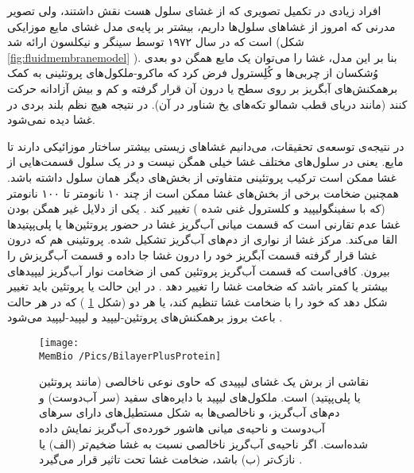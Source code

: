 افراد زیادی در تکمیل تصویری که از غشای سلول هست نقش داشتند، ولی تصویر مدرنی که امروز از غشاهای سلول‌ها داریم، بیشتر بر پایه‌ی مدل غشای مایع موزایکی‌
 است که در سال ۱۹۷۲ توسط سینگر
  و نیکلسون
 ارائه شد
\cite{Singer1972}
(شکل 
\ref{fig:fluidmembranemodel}
). بنا بر این مدل، غشا را می‌توان یک مایع همگن دو بعدی وُشکسان از چربی‌ها و کُلِسترول فرض کرد که ماکرو-ملکول‌های پروتئینی به کمک برهمکنش‌های آبگریز  بر روی سطح یا درون آن قرار گرفته و کم و بیش آزادانه حرکت کنند (مانند دریای قطب شمالو تکه‌های یخ  شناور در آن).  در نتیجه هیچ نظم بلند بردی در غشا دیده نمی‌شود. 

در نتیجه‌ی توسعه‌ی تحقیقات، می‌دانیم غشا‌های زیستی بیشتر ساختار موزائیکی دارند تا مایع. یعنی در سلول‌های مختلف غشا خیلی همگن نیست و در یک سلول قسمت‌هایی از غشا ممکن است  ترکیب پروتئینی متفاوتی از بخش‌های دیگر همان سلول داشته باشد. همچنین ضخامت برخی از بخش‌های غشا ممکن است از چند ۱۰ نانومتر تا ۱۰۰ نانومتر (که با سفینگولیپید
و کلسترول غنی شده
) تغییر کند
\cite{Engelman:2005aa}
. یکی از دلایل غیر همگن بودن غشا عدم تقارنی است که قسمت میانی آب‌گریز غشا در حضور پروتئین‌ها یا پلی‌پپتیدها 
القا می‌کند.  مرکز غشا از نواری از دم‌های آب‌گریز تشکیل شده. پروتئینی هم که درون غشا قرار گرفته قسمت آبگریز خود را درون غشا جا داده و قسمت آب‌گریزش را بیرون. کافی‌است که قسمت آب‌گریز پروتئین  کمی از ضخامت نوار آب‌گریز لیپید‌های  بیشتر یا کمتر باشد که ضخامت غشا را تغییر دهد
\cite{Mouritsen1984}. 
در این حالت یا پروتئین باید تغییر شکل دهد که خود را با ضخامت غشا تنظیم کند، یا هر دو (شکل 
\ref{fig:BilayerPlusProtein}
) که در هر حالت باعث بروز برهمکنش‌‌های پروتئین-لیپید و لیپید-لیپید می‌شود
\cite{Huang1986,Aranda-Espinoza1996,Safran2000,Haselwandter2013,Haselwandter-Christoph2013}
.

\begin{figure}[h]
\begin{center}
\texttt{[image: \\MemBio /Pics/BilayerPlusProtein]}
\caption{
نقاشی از برش یک غشای لیپیدی که حاوی نوعی ناخالصی (مانند پروتئین یا پلی‌پپتید) است. ملکول‌های لیپید با دایره‌های سفید (سر آب‌دوست) و دم‌های آب‌گریز، و  ناخالصی‌ها به شکل مستطیل‌های دارای سر‌های آب‌دوست و ناحیه‌ی میانی هاشور خورده‌ی آب‌گریز نمایش داده شده‌است. اگر ناحیه‌ی آب‌گریز ناخالصی نسبت به غشا ضخیم‌تر (الف) یا نازک‌تر (ب) باشد، ضخامت غشا تحت تاثیر قرار می‌گیرد
\cite{Mouritsen1984}
.
}
\label{fig:BilayerPlusProtein}
\end{center}
\end{figure}




